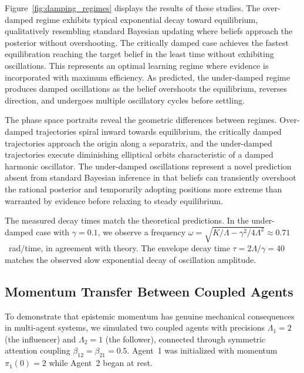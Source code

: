 \documentclass[12pt]{article}
\begin{document}
Figure~\ref{fig:damping_regimes} displays the results of these studies. The over-damped regime exhibits typical exponential decay toward equilibrium, qualitatively resembling standard Bayesian updating where beliefs approach the posterior without overshooting. The critically damped case achieves the fastest equilibration reaching the target belief in the least time without exhibiting oscillations.  This represents an optimal learning regime where evidence is incorporated with maximum efficiency. As predicted, the under-damped regime produces damped oscillations as the belief overshoots the equilibrium, reverses direction, and undergoes multiple oscillatory cycles before settling.

The phase space portraits reveal the geometric differences between regimes. Over-damped trajectories spiral inward towards equilibrium, the critically damped trajectories approach the origin along a separatrix, and the under-damped trajectories execute diminishing elliptical orbits characteristic of a damped harmonic oscillator. The under-damped oscillations represent a novel prediction absent from standard Bayesian inference in that beliefs can transiently overshoot the rational posterior and temporarily adopting positions more extreme than warranted by evidence before relaxing to steady equilibrium.

The measured decay times match the theoretical predictions. In the under-damped case with $\gamma = 0.1$, we observe a frequency $\omega = \sqrt{K/\Lambda - \gamma^2/4\Lambda^2} \approx 0.71$~rad/time, in agreement with theory. The envelope decay time $\tau = 2\Lambda/\gamma = 40$ matches the observed slow exponential decay of oscillation amplitude.

\subsection{Momentum Transfer Between Coupled Agents}

To demonstrate that epistemic momentum has genuine mechanical consequences in multi-agent systems, we simulated two coupled agents with precisions $\Lambda_1 = 2$ (the influencer) and $\Lambda_2 = 1$ (the follower), connected through symmetric attention coupling $\beta_{12} = \beta_{21} = 0.5$. Agent~1 was initialized with momentum $\pi_1(0) = 2$ while Agent~2 began at rest.
\end{document}
